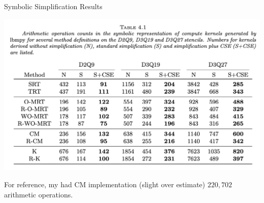 \begin{frame}{Symbolic Simplification Results}
  \centering
  \begin{center}
    \includegraphics[width=0.8\linewidth]{arith_table.png}
  \end{center}
  For reference, my had \textsc{CM} implementation (slight over estimate) $220,702$ arithmetic operations.
\end{frame}



